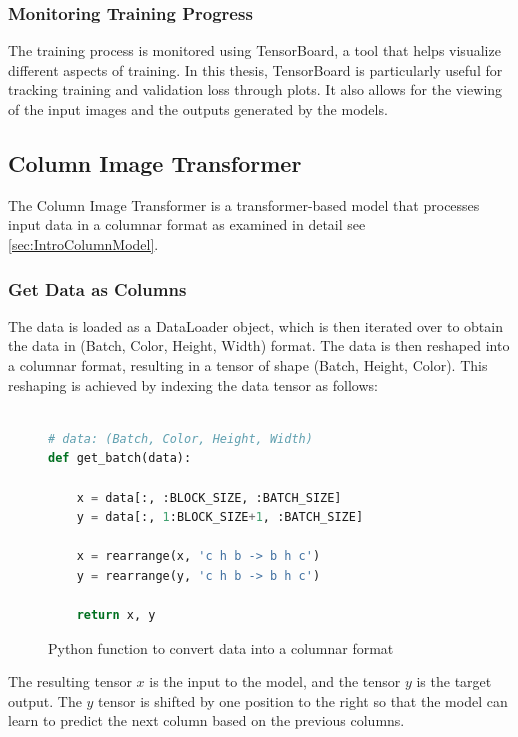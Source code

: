     \subsubsection{Monitoring Training Progress}
    
    The training process is monitored using TensorBoard, a tool that helps visualize different aspects of training. In this thesis, TensorBoard is particularly useful for tracking training and validation loss through plots. It also allows for the viewing of the input images and the outputs generated by the models.    
    
\newpage


\subsection{Column Image Transformer}
    
    The Column Image Transformer is a transformer-based model that processes input data in a columnar format as examined in detail see \autoref{sec:IntroColumnModel}.
    
    \subsubsection{Get Data as Columns}

    The data is loaded as a DataLoader object, which is then iterated over to obtain the data in (Batch, Color, Height, Width) format. The data is then reshaped into a columnar format, resulting in a tensor of shape (Batch, Height, Color). This reshaping is achieved by indexing the data tensor as follows:

\begin{figure}[H]
\centering
\begin{lstlisting}[language=Python]

# data: (Batch, Color, Height, Width)
def get_batch(data):

    x = data[:, :BLOCK_SIZE, :BATCH_SIZE]
    y = data[:, 1:BLOCK_SIZE+1, :BATCH_SIZE]

    x = rearrange(x, 'c h b -> b h c')
    y = rearrange(y, 'c h b -> b h c')

    return x, y
\end{lstlisting}
\caption{Python function to convert data into a columnar format}
\label{fig:get_batch_CIT}
\end{figure}

    The resulting tensor \(x\) is the input to the model, and the tensor \(y\) is the target output. The \(y\) tensor is shifted by one position to the right so that the model can learn to predict the next column based on the previous columns.

